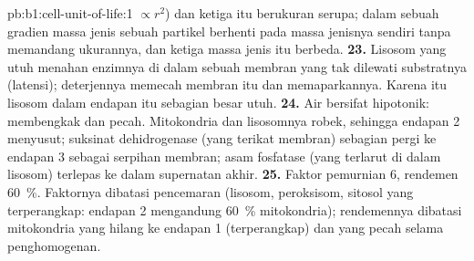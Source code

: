 \begin{solution}{pb:b1:cell-unit-of-life:1}
$\propto r^2$) dan ketiga  itu berukuran serupa; dalam sebuah
gradien massa jenis sebuah partikel berhenti pada massa jenisnya sendiri
tanpa memandang ukurannya, dan ketiga massa jenis itu berbeda.
\textbf{23.} Lisosom yang utuh menahan enzimnya di dalam sebuah membran
yang tak dilewati substratnya (latensi); deterjennya memecah membran itu
dan memaparkannya. Karena itu lisosom dalam endapan itu sebagian besar
utuh.
\textbf{24.} Air bersifat hipotonik:  membengkak dan pecah.
Mitokondria dan lisosomnya robek, sehingga endapan 2 menyusut; suksinat
dehidrogenase (yang terikat membran) sebagian pergi ke endapan 3 sebagai
serpihan membran; asam fosfatase (yang terlarut di dalam lisosom)
terlepas ke dalam supernatan akhir.
\textbf{25.} Faktor pemurnian $6$, rendemen \qty{60}{\%}. Faktornya
dibatasi pencemaran (lisosom, peroksisom, sitosol yang terperangkap:
endapan 2 mengandung \qty{60}{\%} mitokondria); rendemennya dibatasi
mitokondria yang hilang ke endapan 1 (terperangkap) dan yang pecah
selama penghomogenan.
\end{solution}
